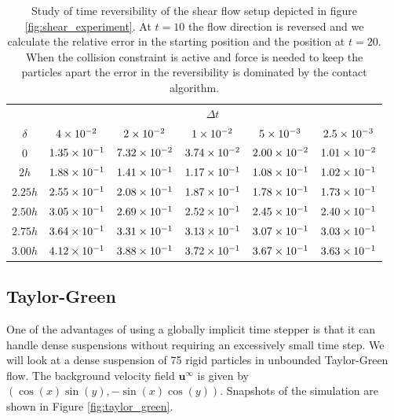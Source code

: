\documentclass[preprint, 10pt]{elsarticle}
\begin{document}
\begin{table}[!h]
\begin{center}
\begin{tabular}{c| c c c c c}
$ $ & & & $\Delta t$ & &\\
$\delta$ & $4\times 10^{-2}$ &$ 2\times 10^{-2}$ & $1\times 10^{-2}$ & $5\times 10^{-3}$ & $2.5\times 10^{-3}$\\
\hline
0 & $1.35\times 10^{-1}$ & $7.32\times 10^{-2}$ & $3.74\times 10^{-2}$ & $2.00\times 10^{-2}$ & $1.01\times 10^{-2}$\\
$2h$ & $1.88\times 10^{-1}$ & $1.41\times 10^{-1}$ & $1.17\times 10^{-1}$ & $1.08\times 10^{-1}$ & $1.02\times 10^{-1}$\\
$2.25h$ & $2.55\times 10^{-1}$ & $2.08\times 10^{-1}$ & $1.87\times 10^{-1}$ & $1.78\times 10^{-1}$ & $1.73\times 10^{-1}$\\
$2.50h$ & $3.05\times 10^{-1}$ & $2.69\times 10^{-1}$ & $2.52\times 10^{-1}$ & $2.45\times 10^{-1}$ & $2.40\times 10^{-1}$\\
$2.75h$ & $3.64\times 10^{-1}$ & $3.31\times 10^{-1}$ & $3.13\times 10^{-1}$ & $3.07\times 10^{-1}$ & $3.03\times 10^{-1}$\\
$3.00h$ & $4.12\times 10^{-1}$ & $3.88\times 10^{-1}$ & $3.72\times 10^{-1}$ & $3.67\times 10^{-1}$ & $3.63\times 10^{-1}$
\end{tabular}
\end{center}
\caption{Study of time reversibility of the shear flow setup depicted in figure \ref{fig:shear_experiment}. At $t=10$ the flow direction is reversed and we calculate the relative error in the starting position and the position at $t=20$. When the collision constraint is active and force is needed to keep the particles apart the error in the reversibility is dominated by the contact algorithm.}\label{tab:reverse}
\end{table}


\subsection{Taylor-Green}

One of the advantages of using a globally implicit time stepper is that it can handle dense suspensions without requiring an excessively small time step. We will look at a dense suspension of 75 rigid particles in unbounded Taylor-Green flow. The background velocity field $\mathbf{u}^\infty$ is given by $(\cos(x)\sin(y), -\sin(x)\cos(y))$. Snapshots of the simulation are shown in Figure \ref{fig:taylor_green}. 
\end{document}
